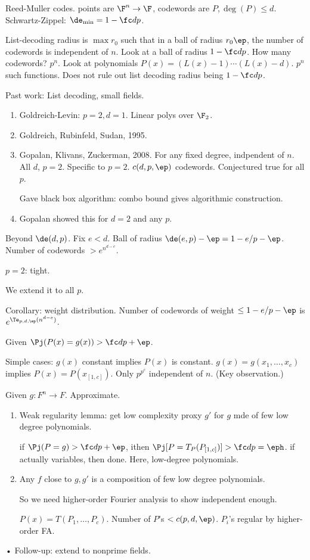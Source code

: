 Reed-Muller codes. points are $\F^n\to \F$, codewords are $P,\deg(P)\le d$.
Schwartz-Zippel: $\de_{\min}=1-\fc dp$.

List-decoding radius is $\max r_0$ such that in a ball of radius $r_0\ep$, the number of codewords is independent of $n$.
Look at a ball of radius $1-\fc dp$. How many codewords? $p^n$. Look at polynomials $P(x)=(L(x)-1)\cdots (L(x)-d)$. $p^n$ such functions. Does not rule out list decoding radius being $1-\fc dp$.

Past work: List decoding, small fields.
\begin{enumerate}
\item
Goldreich-Levin: $p=2,d=1$. Linear polys over $\F_2$.
\item
Goldreich, Rubinfeld, Sudan, 1995. 
\item
Gopalan, Klivans, Zuckerman, 2008. For any fixed degree, indpendent of $n$. All $d$, $p=2$. Specific to $p=2$. $c(d,p,\ep)$ codewords.
Conjectured true for all $p$.

Gave black box algorithm: combo bound gives algorithmic construction.
\item
Gopalan showed this for $d=2$ and any $p$.
\end{enumerate}

Beyond $\de(d,p)$. Fix $e<d$. Ball of radius $\de(e,p)-\ep = 1-e/p-\ep$. Number of codewords $>e^{n^{d-e}}$.

$p=2$: tight.

We extend it to all $p$.

Corollary: weight distribution. Number of codewords of weight $\le 1-e/p-\ep$ is $e^{\Te_{p,d,\ep}(n^{d-e})}$.

Given $\Pj(P(x)=g(x))>\fc dp+\ep$.

Simple cases: $g(x)$ constant implies $P(x)$ is constant.
$g(x)=g(x_1,\ldots, x_c)$ implies $P(x)=P(x_{[1,c]})$. Only $p^{p^c}$ independent of $n$. (Key observation.)

Given $g:F^n\to F$. Approximate.
\begin{enumerate}
\item
Weak regularity lemma: get low complexity proxy $g'$ for $g$ mde of few low degree polynomials.

if $\Pj(P=g)>\fc dp+\ep$, ithen $\Pj[P=T_P(P_{[1,c]})]>\fc dp=\eph$. if actually variables, then done. Here, low-degree polynomials. 
\item
Any $f$ close to $g, g'$ is a composition of few low degree polynomials.

So we need higher-order Fourier analysis to show independent enough.

$P(x)=T(P_1,\ldots, P_c)$. Number of $P$'s $<c(p,d,\ep)$. $P_i$'s regular by higher-order FA.
\end{enumerate}•
Follow-up: extend to nonprime fields.

